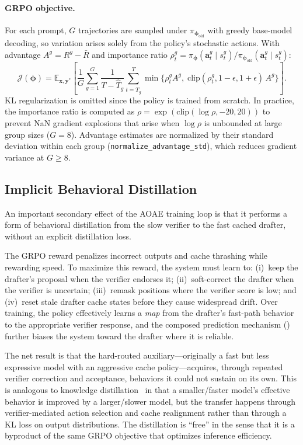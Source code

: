 \documentclass[11pt]{article}
\newcommand{\E}{\mathbb{E}}
\newcommand{\cJ}{\mathcal{J}}
\newcommand{\bphi}{\bm{\phi}}
\newcommand{\bx}{\mathbf{x}}
\newcommand{\by}{\mathbf{y}}
\begin{document}
\paragraph{GRPO objective.}
For each prompt, $G$ trajectories are sampled under $\pi_{\bphi_{\text{old}}}$ with greedy base-model decoding, so variation arises solely from the policy's stochastic actions.
With advantage $A^g = R^g - \bar{R}$ and importance ratio $\rho_t^g = \pi_{\bphi}(\mathbf{a}_t^g \mid s_t^g) / \pi_{\bphi_{\text{old}}}(\mathbf{a}_t^g \mid s_t^g)$:
\begin{equation}
    \cJ(\bphi) = \E_{\bx, \by^*} \left[ \frac{1}{G} \sum_{g=1}^G \frac{1}{T - \hat{T}_g} \sum_{t=\hat{T}_g}^{T} \min\!\Big\{ \rho_t^g A^g,\; \text{clip}(\rho_t^g, 1{-}\epsilon, 1{+}\epsilon)\, A^g \Big\} \right].
    \label{eq:grpo}
\end{equation}
KL regularization is omitted since the policy is trained from scratch.
In practice, the importance ratio is computed as $\rho = \exp(\text{clip}(\log \rho, -20, 20))$ to prevent NaN gradient explosions that arise when $\log \rho$ is unbounded at large group sizes ($G = 8$).
Advantage estimates are normalized by their standard deviation within each group (\texttt{normalize\_advantage\_std}), which reduces gradient variance at $G \geq 8$.

\subsection{Implicit Behavioral Distillation}
\label{sec:distillation}

An important secondary effect of the AOAE training loop is that it performs a form of behavioral distillation from the slow verifier to the fast cached drafter, without an explicit distillation loss.

The GRPO reward penalizes incorrect outputs and cache thrashing while rewarding speed.
To maximize this reward, the system must learn to: (i)~keep the drafter's proposal when the verifier endorses it; (ii)~soft-correct the drafter when the verifier is uncertain; (iii)~remask positions where the verifier score is low; and (iv)~reset stale drafter cache states before they cause widespread drift.
Over training, the policy effectively learns a \emph{map} from the drafter's fast-path behavior to the appropriate verifier response, and the composed prediction mechanism () further biases the system toward the drafter where it is reliable.

The net result is that the hard-routed auxiliary---originally a fast but less expressive model with an aggressive cache policy---acquires, through repeated verifier correction and acceptance, behaviors it could not sustain on its own.
This is analogous to knowledge distillation~\cite{hinton2015distilling} in that a smaller/faster model's effective behavior is improved by a larger/slower model, but the transfer happens through verifier-mediated action selection and cache realignment rather than through a KL loss on output distributions.
The distillation is ``free'' in the sense that it is a byproduct of the same GRPO objective that optimizes inference efficiency.
\end{document}
